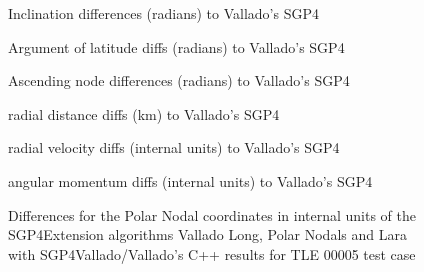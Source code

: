 \documentclass{article}
\begin{document}
\begin{figure}
  \begin{minipage}[b]{.48\linewidth}
    \centering
    
    \centerline{Inclination differences (radians) to Vallado's SGP4}\medskip
  \end{minipage}
  \hfill
  \begin{minipage}[b]{0.48\linewidth}
    \centering
      
  \centerline{Argument of latitude diffs (radians) to Vallado's SGP4}\medskip
  \end{minipage}
  \hfill
  \begin{minipage}[b]{0.48\linewidth}
    \centering
      
  \centerline{Ascending node differences (radians) to Vallado's SGP4}\medskip
  \end{minipage}
  \hfill
  \begin{minipage}[b]{0.48\linewidth}
    \centering
      
    \centerline{radial distance diffs (km) to Vallado's SGP4}\medskip
  \end{minipage}
  \hfill
  \begin{minipage}[b]{0.48\linewidth}
    \centering
      
    \centerline{radial velocity diffs (internal units) to Vallado's SGP4}\medskip
  \end{minipage}
  \hfill
  \begin{minipage}[b]{0.48\linewidth}
    \centering
      
    \centerline{angular momentum diffs (internal units) to Vallado's SGP4}\medskip
  \end{minipage}
  \caption{Differences for the Polar Nodal coordinates in internal units of the SGP4Extension algorithms Vallado Long, Polar Nodals and  Lara with SGP4Vallado/Vallado's C++ results for TLE 00005 test case}
\label{fig:pn0005}
\end{figure}

\vfill\pagebreak



\end{document}
